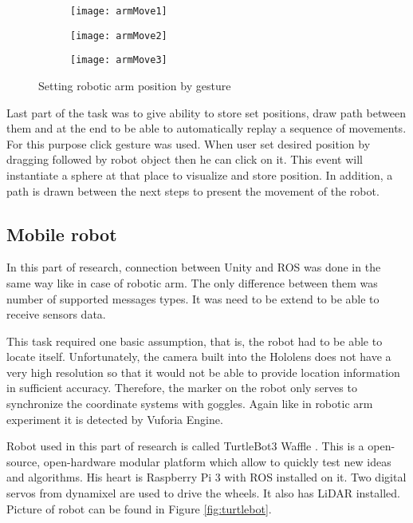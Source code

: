 \documentclass[printmode,en]{mgr}
\begin{document}
\begin{figure}[!ht]
\centering
\begin{subfigure}{.33\textwidth}
  \centering
  \texttt{[image: armMove1]}
\end{subfigure}%
\begin{subfigure}{.33\textwidth}
  \centering
  \texttt{[image: armMove2]}
\end{subfigure}
\begin{subfigure}{.33\textwidth}
  \centering
  \texttt{[image: armMove3]}
\end{subfigure}%
\caption{Setting robotic arm position by gesture}
\label{fig:armMove}
\end{figure}

Last part of the task was to give ability to store set positions, draw path between them and at the end to be able to automatically replay a sequence of movements. For this purpose click gesture was used. When user set desired position by dragging followed by robot object then he can click on it. This event will instantiate a sphere at that place to visualize and store position. In addition, a path is drawn between the next steps to present the movement of the robot.

\subsection{Mobile robot}
In this part of research, connection between Unity and ROS was done in the same way like in case of robotic arm. The only difference between them was number of supported messages types. It was need to be extend to be able to receive sensors data.

This task required one basic assumption, that is, the robot had to be able to locate itself. Unfortunately, the camera built into the Hololens does not have a very high resolution so that it would not be able to provide location information in sufficient accuracy. Therefore, the marker on the robot only serves to synchronize the coordinate systems with goggles. Again like in robotic arm experiment it is detected by Vuforia Engine.

Robot used in this part of research is called TurtleBot3 Waffle \cite{turtlebot}. This is a open-source, open-hardware modular platform which allow to quickly test new ideas and algorithms. His heart is Raspberry Pi 3 with ROS installed on it. Two digital servos from dynamixel are used to drive the wheels. It also has LiDAR installed. Picture of robot can be found in Figure \ref{fig:turtlebot}.
\end{document}
